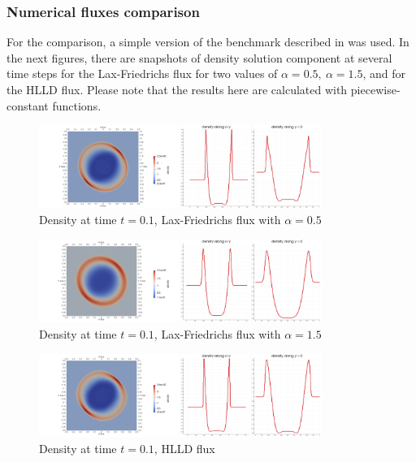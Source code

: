 \subsubsection{Numerical fluxes comparison}
\label{subsec:numfluxcomp}
For the comparison, a simple version of the benchmark described in  was used. In the next figures, there are snapshots of density solution component at several time steps for the Lax-Friedrichs flux for two values of $\alpha = 0.5,\ \alpha=1.5$, and for the HLLD flux. Please note that the results here are calculated with piecewise-constant functions.
	\begin{figure}[H]
		\begin{center}
			\includegraphics[width=0.82\textwidth]{img/numflux/lf1.jpg}
			\vspace{-3mm}
			\caption{Density at time $t = 0.1$, Lax-Friedrichs flux with $\alpha = 0.5$}
		\end{center}
	\end{figure}\vspace{-5mm}
	\begin{figure}[H]
		\begin{center}
			\includegraphics[width=0.82\textwidth]{img/numflux/lfw1.jpg}
			\vspace{-3mm}
		\caption{Density at time $t = 0.1$, Lax-Friedrichs flux with $\alpha = 1.5$}
		\end{center}
	\end{figure}\vspace{-5mm}
	\begin{figure}[H]
		\begin{center}
			\includegraphics[width=0.82\textwidth]{img/numflux/hl1.jpg}
			\vspace{-3mm}
		\caption{Density at time $t = 0.1$, HLLD flux}
		\end{center}
	\end{figure}\vspace{-5mm}
	\newpage
	
